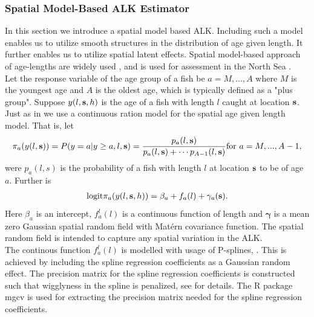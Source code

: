\documentclass[a4paper 12pt]{article}
\numberwithin{equation}{section}
\begin{document}
\subsubsection{Spatial Model-Based ALK Estimator}
\label{sec:spatialModelALK}
In this section we introduce a spatial model based ALK. Including such a model enables us to utilize smooth structures in the distribution of age given length. It further enables us to utilize spatial latent effects. Spatial model-based approach of age-lengths are widely used \citep{berg2012spatial, rindorf2001analyses, hirst2012bayesian}, and is used for assessment in the North Sea \citep{berg2014evaluation}. \\ %
\indent Let the response variable of the age group of a fish be $a = M,...,A$ where $M$ is the youngest age and $A$ is the oldest age, which is typically defined as a "plus group". Suppose $y(l,{\bf s},h)$ is the age  of a fish with length $l$ caught at location ${\bf s}$. Just as in \citet{berg2012spatial} we use a continuous ration model for the spatial age given length model. That is, let
\begin{align}
\pi_a(y(l,{\bf s})) = P(y = a|y \geq a, l, {\bf s}) = \frac{p_a(l,{\bf s})}{p_a(l,{\bf s}) + \cdots p_{A-1}(l,{\bf s})} \vspace{ 4mm} \text{for } a =M,...,A-1 ,
\end{align}
were $p_a(l,s)$ is the probability of a fish with length $l$ at location ${\bf s}$ to be of age $a$. Further is
\begin{align}\label{eq:linearPred}
\text{logit}\pi_a(y(l,{\bf s},h)) = \beta_a +  f_a(l) + \gamma_a({\bf s}).
\end{align}
Here $\beta_a$ is an intercept, $ f_a^l(l)$ is a continuous function of length and $\pmb{\gamma}$ is a mean zero Gaussian spatial random field with Mat\'{e}rn covariance function. The spatial random field is intended to capture any spatial variation in the ALK.\\  
\indent The continous function $f_a^l(l)$ is modelled with usage of P-splines, \citep{wood2017generalized}. This is achieved by including the spline regression coefficients as a Gaussian random effect. The precision matrix for the spline regression coefficients is constructed such that wigglyness in the spline is penalized, see \citet[page 239]{wood2017generalized} for details. The R package mgcv \citep{wood2015package} is used for extracting the precision matrix needed for the spline regression coefficients.
\end{document}
